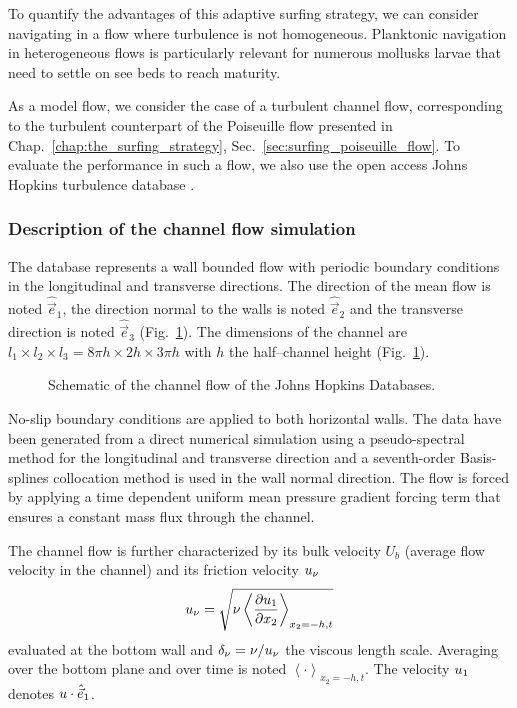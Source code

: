 To quantify the advantages of this adaptive surfing strategy, we can consider navigating in a flow where turbulence is not homogeneous.
Planktonic navigation in heterogeneous flows is particularly relevant for numerous mollusks larvae that need to settle on see beds to reach maturity.

As a model flow, we consider the case of a turbulent channel flow, corresponding to the turbulent counterpart of the Poiseuille flow presented in Chap.~\ref{chap:the_surfing_strategy}, Sec.~\ref{sec:surfing_poiseuille_flow}.
To evaluate the performance in such a flow, we also use the open access Johns Hopkins turbulence database \citep{li2008public, perlman2007data}.

\subsubsection{Description of the channel flow simulation}

The database represents a wall bounded flow with periodic boundary conditions in the longitudinal and transverse directions.
The direction of the mean flow is noted $\hat{\vec{e}}_1$, the direction normal to the walls is noted $\hat{\vec{e}}_2$ and the transverse direction is noted $\hat{\vec{e}}_3$ (Fig.~\ref{fig:scheme_channel}).
The dimensions of the channel are $l_1 \times l_2 \times l_3 = 8\pi h \times 2 h \times 3 \pi h$ with $h$ the half–channel height (Fig.~\ref{fig:scheme_channel}).
\begin{figure}
	\centering
	\def\svgwidth{0.8\textwidth}
	
  	\caption{
  		Schematic of the channel flow of the Johns Hopkins Databases.
  	}
  	\label{fig:scheme_channel}
\end{figure}
No-slip boundary conditions are applied to both horizontal walls.
The data have been generated from a direct numerical simulation using a pseudo-spectral method for the longitudinal and transverse direction and a seventh-order Basis-splines collocation method is used in the wall normal direction.
The flow is forced by applying a time dependent uniform mean pressure gradient forcing term that ensures a constant mass flux through the channel.

The channel flow is further characterized by its bulk velocity $U_b$ (average flow velocity in the channel) and its friction velocity $u_{\nu}$
\begin{equation}
	u_{\nu} = \sqrt{\nu \left\langle \frac{\partial u_1}{\partial x_2} \right\rangle_{x_2=-h,t}}
\end{equation}
evaluated at the bottom wall and $\delta_\nu = \nu / u_{\nu}$ the viscous length scale.
Averaging over the bottom plane and over time is noted $\left\langle \cdot \right\rangle_{x_2=-h,t}$.
The velocity $u_1$ denotes $u \cdot \hat{\vec{e}}_1$.

